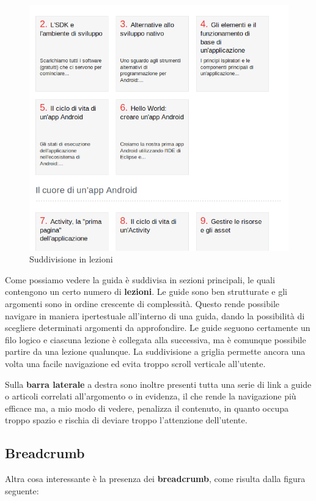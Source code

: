 \begin{figure}[H]
\centering
\includegraphics[width=120mm]{images/internal2.png}
\caption{Suddivisione in lezioni}
\end{figure}

Come possiamo vedere la guida è suddivisa in sezioni principali, le quali contengono un certo numero di \textbf{lezioni}. Le guide sono ben strutturate e gli argomenti sono in ordine crescente di complessità. Questo rende possibile navigare in maniera ipertestuale all'interno di una guida, dando la possibilità di scegliere determinati argomenti da approfondire. Le guide seguono certamente un filo logico e ciascuna lezione è collegata alla successiva, ma è comunque possibile partire da una lezione qualunque. La suddivisione a griglia permette ancora una volta una facile navigazione ed evita troppo scroll verticale all'utente.

Sulla \textbf{barra laterale} a destra sono inoltre presenti tutta una serie di link a guide o articoli correlati all'argomento o in evidenza, il che rende la navigazione più efficace ma, a mio modo di vedere, penalizza il contenuto, in quanto occupa troppo spazio e rischia di deviare troppo l'attenzione dell'utente.

\subsection{Breadcrumb}

Altra cosa interessante è la presenza dei \textbf{breadcrumb}, come risulta dalla figura seguente:

